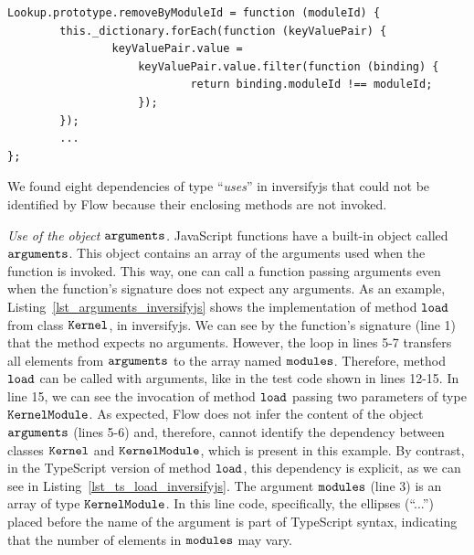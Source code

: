 \documentclass[review]{elsarticle}
\newcommand{\aspas}[1]{{``#1''}}
\newcommand{\mcode}[1]{$\tt #1$}
\begin{document}
\begin{lstlisting}[caption=Example of method that is not used in {\sc inversifyjs}, label=lst_unused_inversifyjs,  emph={[2]moduleId},emphstyle={[2]\ttfamily\bfseries\color{darkgreen}}, emph={[3]},emphstyle={[3]\ttfamily\bfseries\color{purple}}]
Lookup.prototype.removeByModuleId = function (moduleId) {
		this._dictionary.forEach(function (keyValuePair) {
				keyValuePair.value = 
					keyValuePair.value.filter(function (binding) {
							return binding.moduleId !== moduleId;
					});
		});
		...
};
\end{lstlisting} 

We found eight dependencies of type \aspas{\textit{uses}} in {\sc inversifyjs} that could not be identified by Flow because their enclosing methods are not invoked. 

\vspace{0.3cm}

\noindent \textit{Use of the object \mcode{arguments}.} JavaScript functions have a built-in object called \mcode{arguments}. This object contains an array of the arguments used when the function is invoked. This way, one can call a function passing arguments even when the function's signature does not expect any arguments. As an example, Listing~\ref{lst_arguments_inversifyjs} shows the implementation of method \mcode{load} from class \mcode{Kernel}, in {\sc inversifyjs}. We can see by the function's signature (line 1) that the method expects no arguments. However, the loop in lines 5-7 transfers all elements from \mcode{arguments} to the array named \mcode{modules}. Therefore, method \mcode{load} can be called with arguments, like in the test code shown in lines 12-15. In line 15, we can see the invocation of method \mcode{load} passing two parameters of type \mcode{KernelModule}. As expected, Flow does not infer the content of the object \mcode{arguments} (lines 5-6) and, therefore, cannot identify the dependency between classes \mcode{Kernel} and \mcode{KernelModule}, which is present in this example. By contrast, in the TypeScript version of method \mcode{load}, this dependency is explicit, as we can see in Listing~\ref{lst_ts_load_inversifyjs}. The argument \mcode{modules} (line 3) is an array of type \mcode{KernelModule}. In this line code, specifically, the ellipses (\aspas{...}) placed before the name of the argument is part of TypeScript syntax, indicating that the number of elements in \mcode{modules} may vary.

\vspace{0.07cm}
\end{document}
